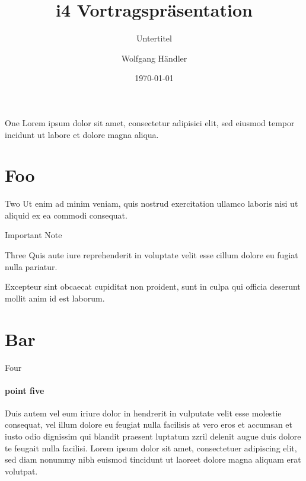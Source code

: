 \documentclass[aspectratio=1610,12pt]{beamer}
\title[i4talk]{i4 Vortragspräsentation}
\subtitle{Untertitel}
\date{\today}
\author{Wolfgang Händler}
\institute{Friedrich-Alexander-Universität Erlangen-Nürnberg}
\begin{document}
\maketitle[extern]

\begin{frame}{One}
	Lorem ipsum dolor sit amet, consectetur adipisici elit, sed eiusmod tempor incidunt ut labore et dolore magna aliqua. 
\end{frame}


\section{Foo}

\begin{frame}{Two}
	Ut enim ad minim veniam, quis nostrud exercitation ullamco laboris nisi ut aliquid ex ea commodi consequat.
\end{frame}

\begin{frame}
	Important Note
\end{frame}

\begin{frame}{Three}
	Quis aute iure reprehenderit in voluptate velit esse cillum dolore eu fugiat nulla pariatur.
	\begin{block}{Excepteur}
		sint obcaecat cupiditat non proident, sunt in culpa qui officia deserunt mollit anim id est laborum.
	\end{block}
\end{frame}


\section{Bar}

\begin{frame}{Four}
	\framesubtitle{point five}
	\small
	Duis autem vel eum iriure dolor in hendrerit in vulputate velit esse molestie consequat, vel illum dolore eu feugiat nulla facilisis at vero eros et accumsan et iusto odio dignissim qui blandit praesent luptatum zzril delenit augue duis dolore te feugait nulla facilisi. Lorem ipsum dolor sit amet, consectetuer adipiscing elit, sed diam nonummy nibh euismod tincidunt ut laoreet dolore magna aliquam erat volutpat.


\end{frame}
\end{document}
